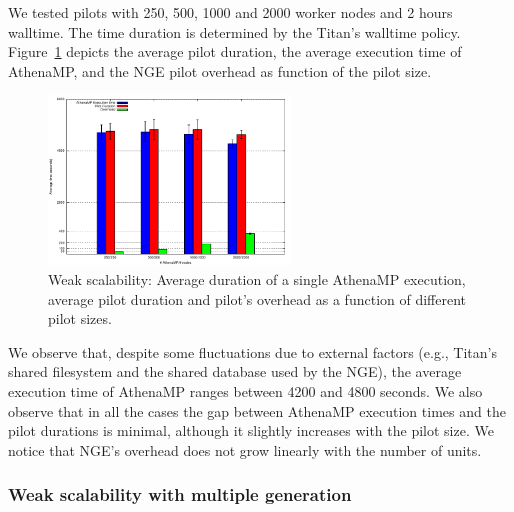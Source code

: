 We tested %
pilots %
with 250, 500, 1000 and 2000 worker nodes and
2 hours walltime. The time duration is determined by the Titan's walltime policy. Figure~\ref{fig:weakScal1a} depicts the average pilot
duration, the average execution time of AthenaMP, and the NGE pilot overhead as
function of the pilot size.

\begin{figure}[!htb]
        \includegraphics[height=4.5cm,width=\columnwidth]{./figures/NGE/weak1.pdf}
    \caption{Weak scalability: Average duration of a
    single AthenaMP execution, average pilot duration and pilot's overhead as a function of different pilot sizes. }
\label{fig:weakScal1a}
\end{figure}

We %
observe that, despite some fluctuations due to external factors
(e.g., Titan's shared filesystem and the shared database used by the NGE), the
average execution time of AthenaMP %
ranges between 4200 and 4800 seconds. %
We %
also observe that in all the cases the gap between AthenaMP execution times and
the pilot durations is minimal, although it slightly increases with the pilot
size. %
We %
notice that NGE's overhead does not grow linearly with the number of units.



\subsubsection{Weak scalability with multiple generation }

